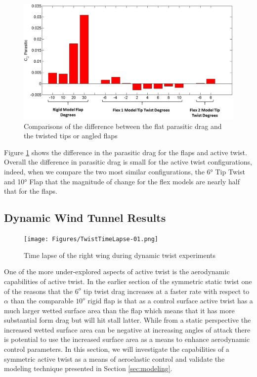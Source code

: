 \documentclass[11pt]{ucthesis}
\begin{document}
\begin{figure}[thpb]
\centering
\includegraphics[width=.75\linewidth]{Figures/CdPDiffCompare.png}
\caption{Comparisons of the difference between the flat parasitic drag and the twisted tips or angled flaps}
\label{fig:parasiticDiff}
\end{figure}


Figure \ref{fig:parasiticDiff} shows the difference in the parasitic drag for the flaps and active twist. Overall the difference in parasitic drag is small for the active twist configurations, indeed, when we compare the two most similar configurations, the 6° Tip Twist and 10° Flap that the magnitude of change for the flex models are nearly half that for the flaps.

\subsection{Dynamic Wind Tunnel Results}
\label{sec:DWTR}

\begin{figure}[thpb]
\centering
\texttt{[image: Figures/TwistTimeLapse-01.png]}
\caption{Time lapse of the right wing during dynamic twist experiments}
\label{fig:timelapse}
\end{figure}

One of the more under-explored aspects of active twist is the aerodynamic capabilities of active twist. In the earlier section of the symmetric static twist one of the reasons that the $6^o$ tip twist drag increases at a faster rate with respect to $\alpha$ than the comparable $10^o$ rigid flap is that as a control surface active twist has a much larger wetted surface area than the flap which means that it has more substantial form drag but will hit stall latter. While from a static perspective the increased wetted surface area can be negative at increasing angles of attack there is potential to use the increased surface area as a means to enhance aerodynamic control parameters. In this section, we will investigate the capabilities of a symmetric active twist as a means of aeroelastic control and validate the modeling technique presented in Section \ref{sec:modeling}.
\end{document}
